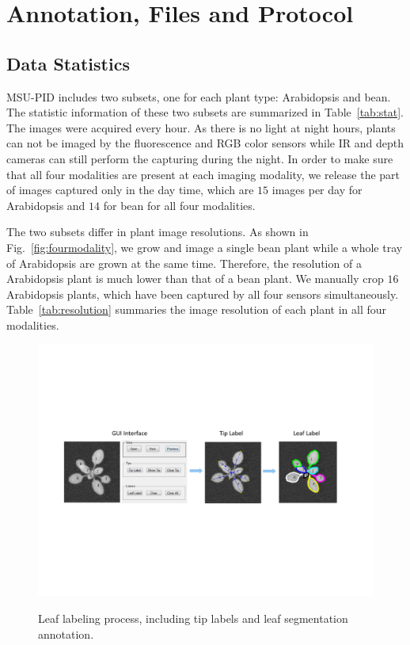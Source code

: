 \section{Annotation, Files and Protocol}
\subsection{Data Statistics}
MSU-PID includes two subsets, one for each plant type: Arabidopsis and bean.
The statistic information of these two subsets are summarized in Table~\ref{tab:stat}.
The images were acquired every hour.
As there is no light at night hours, plants can not be imaged by the fluorescence and RGB color sensors while IR and depth cameras can still perform the capturing during the night.
In order to make sure that all four modalities are present at each imaging modality, we release the part of images captured only in the day time, which are $15$ images per day for Arabidopsis and $14$ for bean for all four modalities.

The two subsets differ in plant image resolutions.
As shown in Fig.~\ref{fig:fourmodality}, we grow and image a single bean plant while a whole tray of Arabidopsis are grown at the same time.
Therefore, the resolution of a Arabidopsis plant is much lower than that of a bean plant.
We manually crop $16$ Arabidopsis plants, which have been captured by all four sensors simultaneously.
Table~\ref{tab:resolution} summaries the image resolution of each plant in all four modalities.


\begin{figure}
\centering
\includegraphics[width=.90\textwidth]{Figures/labeling}\\
\caption{Leaf labeling process, including tip labels and leaf segmentation annotation.}
\label{fig:label}
\end{figure}

